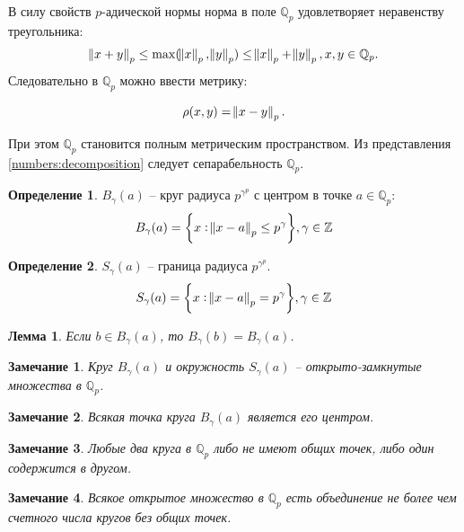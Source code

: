 \documentclass[master, och, diploma, times]{sty/SCWorks}
\theoremstyle{plain}
\newtheorem{lemma}{Лемма}[section]
\newtheorem{note}{Замечание}[section]
\theoremstyle{definition}
\newtheorem{defn}{Определение}[section]
\begin{document}
В силу свойств $p$-адической нормы норма в поле $\mathbb {Q}_p$ удовлетворяет неравенству треугольника:
$$\norm{x + y}_p \le \max(\norm{x}_p, \norm{y}_p) \le \norm{x}_p + \norm{y}_p, x,y \in \mathbb {Q}_p.$$
\noindent Следовательно в $\mathbb {Q}_p$ можно ввести метрику:

\begin{equation}
	\rho (x,y)=\norm{x-y}_p.
\end{equation}

\noindent При этом $\mathbb {Q}_p$ становится полным метрическим пространством. Из представления \eqref{numbers:decomposition} следует сепарабельность $\mathbb {Q}_p$.  

\begin{defn}
$B_{\gamma}(a)$ -- круг радиуса $p^{\gamma^p}$ с центром в точке $a \in \mathbb {Q}_p$:
\begin{equation}
	B_\gamma(a) = \bigg\{x: \norm{x-a}_p \le p^{\gamma} \bigg\}, \gamma \in \mathbb {Z}
\end{equation}
\end{defn}

\begin{defn}
$S_{\gamma}(a)$ -- граница радиуса $p^{\gamma^p}$.
\begin{equation}
	S_\gamma(a) = \bigg\{x: \norm{x-a}_p = p^{\gamma} \bigg\}, \gamma \in \mathbb {Z}
\end{equation}
\end{defn}

\begin{lemma}
Если $b \in B_{\gamma}(a)$, то $B_{\gamma}(b)=B_{\gamma}(a)$.
\end{lemma}

\begin{note}
Круг $B_{\gamma}(a)$ и окружность $S_{\gamma}(a)$ -- открыто-замкнутые множества в $\mathbb {Q}_p$.
\end{note}

\begin{note}
Всякая точка круга $B_{\gamma}(a)$ является его центром.
\end{note}

\begin{note}
Любые два круга в $\mathbb {Q}_p$ либо не имеют общих точек, либо один содержится в другом.
\end{note}

\begin{note}
Всякое открытое множество в $\mathbb {Q}_p$ есть объединение не более чем счетного числа кругов без общих точек.
\end{note}
\end{document}
